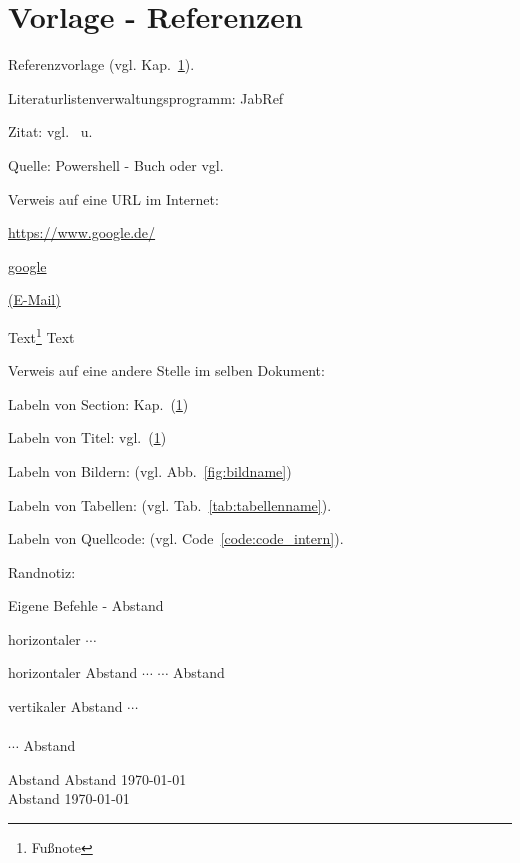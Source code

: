 \section{Vorlage - Referenzen}\label{sec:vorlage_ref}

Referenzvorlage (vgl. Kap.~\ref{sec:vorlage_ref}).

Literaturlistenverwaltungsprogramm: JabRef


Zitat: vgl.~\cite{monk_action_buch:2016} u. \cite{kofler_linux:2017} 

Quelle: Powershell - Buch oder vgl.~\cite{schwichtenberg_ps:2017}


Verweis auf eine URL im Internet: 

\url{https://www.google.de/}

\href{https://www.google.de/}{google}

\href{mailto:xx@yy.eu}{(E-Mail)} 

\href{file:content/bsp/logo.pdf}{}



Text\footnote{Fußnote} Text

Verweis auf eine andere Stelle im selben Dokument:

Labeln von Section: Kap.~(\ref{sec:vorlage_ref}) 

Labeln von Titel: vgl.~(\ref{sec:vorlage_ref}) 

Labeln von Bildern: (vgl. Abb.~\ref{fig:bildname})

Labeln von Tabellen: (vgl. Tab.~\ref{tab:tabellenname}).

Labeln von Quellcode: (vgl. Code~\ref{code:code_intern}). 


Randnotiz:  


Eigene Befehle - Abstand

   

horizontaler $\cdots$ 

horizontaler Abstand $\cdots$ \hspace{2em} $\cdots$ Abstand

vertikaler Abstand $\cdots$\\
\vspace{3em}\\
$\cdots$ Abstand


Abstand
\vfill
Abstand \hfill \today\\
Abstand \hfil \today
